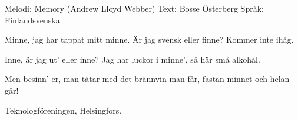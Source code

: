 \begin{song}

\begin{songmeta}
Melodi: Memory (Andrew Lloyd Webber)
Text: Bosse Österberg
Språk: Finlandsvenska
\end{songmeta}

\begin{songtext}
Minne, jag har tappat mitt minne.
Är jag svensk eller finne?
Kommer inte ihåg.

Inne, är jag ut' eller inne?
Jag har luckor i minne',
så här små alkohål.

Men besinn' er,
man tätar med det brännvin man får,
fastän minnet och helan går!
\end{songtext}

\begin{songnotes}
Teknologföreningen, Helsingfors.
\end{songnotes}
\end{song}
